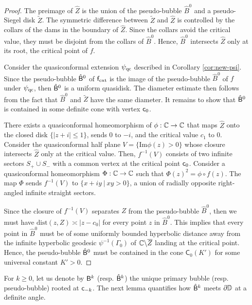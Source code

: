 \documentclass{amsart}
\begin{document}
\begin{proof}
    The preimage of $\hat{Z}$ is the union of the pseudo-bubble $\hat{B}^0$ and a pseudo-Siegel disk $\tilde{Z}$. 
    The symmetric difference between $\tilde{Z}$ and $\hat{Z}$ is controlled by the collars of the dams in the boundary of $\hat{Z}$. 
    Since the collars avoid the critical value, they must be disjoint from the collars of $\hat{B}^0$. 
    Hence, $\hat{B}^0$ intersects $\hat{Z}$ only at its root, the critical point of $f$.
    
    Consider the quasiconformal extension $\psi_{\textnormal{qc}}$ described in Corollary \ref{cor:new-psi}. 
    Since the pseudo-bubble $\hat{\mathsf{B}}^0$ of $\mathsf{f}_{\textnormal{ext}}$ is the image of the pseudo-bubble $\hat{B}^0$ of $f$ under $\psi_{\textnormal{qc}}$, then $\hat{\mathsf{B}}^0$ is a uniform quasidisk. The diameter estimate then follows from the fact that $\hat{B}^0$ and $\tilde{Z}$ have the same diameter. It remains to show that $\hat{\mathsf{B}}^0$ is contained in some definite cone with vertex $\mathsf{c}_0$.

    There exists a quasiconformal homeomorphism of $\phi : \mathbb{C}\to \mathbb{C}$ that maps $\hat{Z}$ onto the closed disk $\{|z+i|\leq 1\}$, sends $0$ to $-i$, and the critical value $c_1$ to $0$. 
    Consider the quasiconformal half plane $V = \{ \text{Im}\phi(z)>0\}$ whose closure intersects $\hat{Z}$ only at the critical value. 
    Then, $f^{-1}(V)$ consists of two infinite sectors $S_+ \cup S_-$ with a common vertex at the critical point $\mathsf{c}_0$. 
    Consider a quasiconformal homeomorphism $\Phi : \mathbb{C} \to \mathbb{C}$ such that $ \Phi(z)^2 = \phi\circ f(z)$. 
    The map $\Phi$ sends $f^{-1}(V)$ to $\{x+iy \: | \: xy>0\}$, a union of radially opposite right-angled infinite straight sectors. 
    
    Since the closure of $f^{-1}(V)$ separates $Z$ from the pseudo-bubble $\hat{B}^0$, then we must have $\text{dist}(z,Z) \asymp |z-c_0|$ for every point $z$ in $\hat{B}^0$. 
    This implies that every point in $\hat{B}^0$ must be of some uniformly bounded hyperbolic distance away from the infinite hyperbolic geodesic $\psi^{-1}(\Gamma_0)$ of $\mathbb{C} \backslash \overline{Z}$ landing at the critical point. 
    Hence, the pseudo-bubble $\hat{\mathsf{B}}^0$ must be contained in the cone $\mathsf{C}_0(K')$ for some universal constant $K'>0$.
\end{proof}

For $k \geq 0$, let us denote by $\mathsf{B}^k$ (resp. $\hat{\mathsf{B}}^k$) the unique primary bubble (resp. pseudo-bubble) rooted at $\mathsf{c}_{-k}$. 
The next lemma quantifies how $\hat{\mathsf{B}}^k$ meets $\partial \mathbb{D}$ at a definite angle.
\end{document}
